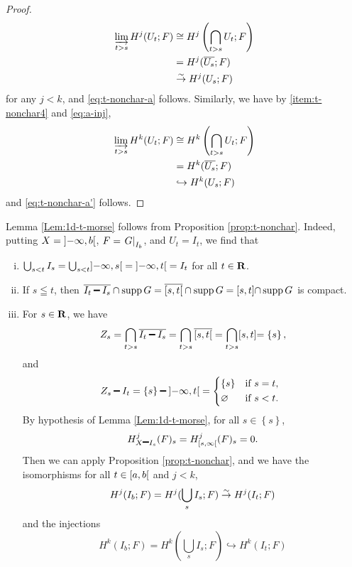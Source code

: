 \begin{proof}
\begin{align*}
    \indlim[t>s]H^{j}(U_t;F)
    &\cong 
    H^{j}\left(\bigcap_{t>s}U_t;F\right)\\
    &=
    H^{j}(\overline{U_s};F)\\
    &\simar
    H^{j}(U_s;F)
  \end{align*}
  for any \(j<k\), and \ref{eq:t-nonchar-a} follows. 
  Similarly, 
  we have by \eqref{item:t-nonchar4} and \eqref{eq:a-inj},
    \begin{align*}
    \indlim[t>s]H^{k}(U_t;F)
    &\cong 
    H^{k}\left(\bigcap_{t>s}U_t;F\right)\\
    &=
    H^{k}(\overline{U_s};F)\\
    &\hookrightarrow
    H^{k}(U_s;F)
  \end{align*}
  and \ref{eq:t-nonchar-a'} follows.
\end{proof}













\begin{Remark+}
  Lemma \ref{Lem:1d-t-morse} follows from 
  Proposition \ref{prop:t-nonchar}. 
  Indeed, putting \(X=\lopen-\infty,b\ropen\), 
  \(F=\mres[G]{I_{b}}\), and \(U_t=I_t\), 
  we find that \begin{enumerate}[(i)]
    \item \(\bigcup_{s<t} I_s
    = \bigcup_{s<t}\lopen-\infty,s\ropen
    = \lopen-\infty,t\ropen= I_t\) for all \(t\in\rr\). 
    \item If \(s\leqq t\), then \(
      \overline{I_t\smi I_s}\cap\supp{G}
      =\overline{\lclosed s,t\ropen}\cap\supp{G}
      =\lclosed s,t\rclosed\cap\supp{G}
      \) is compact.
    \item For \(s\in\rr\), we have \[
      Z_{s}
      =\bigcap_{t>s}\overline{I_{t}\smi I_{s}}
      =\bigcap_{t>s}\overline{\lclosed s,t\ropen}
      =\bigcap_{t>s}\lclosed s,t\rclosed
      =\left\{s\right\},
    \]
    and \[
      Z_s\smi I_t
      =\left\{s\right\}\smi \lopen-\infty,t\ropen
      =\begin{cases*}
        \left\{s\right\}& if \(s=t\),\\
        \varnothing& if \(s<t\).
      \end{cases*}
    \]
    By hypothesis of Lemma \ref{Lem:1d-t-morse}, 
    for all \(s\in \left\{s\right\}\), 
    \[
      H^{j}_{X\smi I_s}(F)_{s}
      =H^{j}_{\lclosed s,\infty\ropen}(F)_{s}=0.
    \]
    Then we can apply Proposition \ref{prop:t-nonchar}, and 
    we have the isomorphisms for all \(t\in \lclosed a,b\ropen\) and \(j<k\),
    \[
      H^{j}(I_{b};F)
      =H^{j}(\bigcup_{s}I_{s};F)
      \simar
      H^{j}(I_{t};F)
    \]
    and the injections
    \[
      H^{k}(I_{b};F)
      =H^{k}(\bigcup_{s}I_{s};F)
      \hookrightarrow
      H^{k}(I_{t};F)
    \]
  \end{enumerate}
\end{Remark+}


